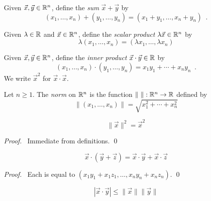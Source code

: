 \begin{definition}
    Given $\vec{x}, \vec{y} \in \mathbb{R}^n$, define the \emph{sum} $\vec{x} + \vec{y}$ by
    \[ (x_1, \ldots, x_n) + (y_1, \ldots, y_n) = (x_1 + y_1, \ldots, x_n + y_n) \enspace . \]
\end{definition}

\begin{definition}
    Given $\lambda \in \mathbb{R}$ and $\vec{x} \in \mathbb{R}^n$, define the \emph{scalar product} $\lambda \vec{x} \in \mathbb{R}^n$ by
    \[ \lambda (x_1, \ldots, x_n) = (\lambda x_1, \ldots, \lambda x_n) \]
\end{definition}

\begin{definition}
    Given $\vec{x}, \vec{y} \in \mathbb{R}^n$, define the \emph{inner product} $\vec{x} \cdot \vec{y} \in \mathbb{R}$ by
    \[ (x_1, \ldots, x_n) \cdot (y_1, \ldots, y_n) = x_1 y_1 + \cdots + x_n y_n \enspace . \]
    We write $\vec{x}^2$ for $\vec{x} \cdot \vec{x}$.
\end{definition}

\begin{definition}[Norm]
    Let $n \geq 1$. The \emph{norm} on $\mathbb{R}^n$ is the function $\| \ \| : \mathbb{R}^n \rightarrow \mathbb{R}$ defined by
    \[ \| (x_1, \ldots, x_n) \| = \sqrt{x_1^2 + \cdots + x_n^2} \]
\end{definition}

\begin{lemma}
    \[ \| \vec{x} \|^2 = \vec{x}^2 \]
\end{lemma}

\begin{proof}
    \pf\ Immediate from definitions. \qed
\end{proof}

\begin{lemma}
    \[ \vec{x} \cdot (\vec{y} + \vec{z}) = \vec{x} \cdot \vec{y} + \vec{x} \cdot \vec{z} \]
\end{lemma}

\begin{proof}
    \pf\ Each is equal to $(x_1 y_1 + x_1 z_1, \ldots, x_n y_n + x_n z_n)$. \qed
\end{proof}

\begin{lemma}
    \label{lemma:Cauchy-Schwarz}
    \[ |\vec{x} \cdot \vec{y}| \leq \| \vec{x} \| \| \vec{y} \| \]
\end{lemma}

